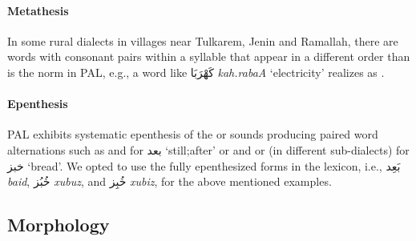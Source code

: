 

\paragraph{Metathesis} 
In some rural dialects in villages near Tulkarem, Jenin and Ramallah, there are words with consonant pairs within a syllable that appear in a different order than is the norm in PAL, e.g., a word like \foreignlanguage{arabic}{كَهْرَبَا} 
{\it kah.rabaA}  `electricity' realizes as .

\paragraph{Epenthesis}
PAL exhibits systematic epenthesis of the  or  sounds producing paired word alternations
such as  and  for \foreignlanguage{arabic}{بعد} `still;after'
or
 and  or  (in different sub-dialects) for \foreignlanguage{arabic}{خبز} `bread'.
We opted to use the fully epenthesized forms in the lexicon, i.e., 
\foreignlanguage{arabic}{بَعِد}
\textit{ba{\AYN}id},
\foreignlanguage{arabic}{خُبُز}
\textit{xubuz},
and
\foreignlanguage{arabic}{خُبِز}
\textit{xubiz}, for the above mentioned examples.




\subsection*{Morphology}

